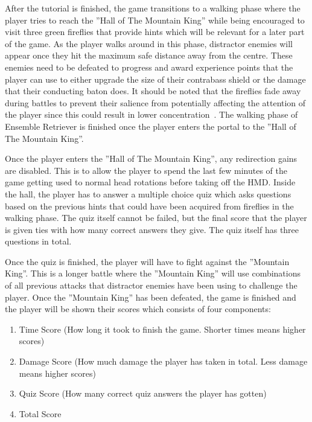 After the tutorial is finished, the game transitions to a walking phase where the player tries to reach the ''Hall of The Mountain King'' while being encouraged to visit three green fireflies that provide hints which will be relevant for a later part of the game. As the player walks around in this phase, distractor enemies will appear once they hit the maximum safe distance away from the centre. These enemies need to be defeated to progress and award experience points that the player can use to either upgrade the size of their contrabass shield or the damage that their conducting baton does. It should be noted that the fireflies fade away during battles to prevent their salience from potentially affecting the attention of the player since this could result in lower concentration~\cite{sitzmann2018saliency}. The walking phase of Ensemble Retriever is finished once the player enters the portal to the ''Hall of The Mountain King''. 

Once the player enters the ''Hall of The Mountain King'', any redirection gains are disabled. This is to allow the player to spend the last few minutes of the game getting used to normal head rotations before taking off the HMD. Inside the hall, the player has to answer a multiple choice quiz which asks questions based on the previous hints that could have been acquired from fireflies in the walking phase. The quiz itself cannot be failed, but the final score that the player is given ties with how many correct answers they give. The quiz itself has three questions in total.

Once the quiz is finished, the player will have to fight against the ''Mountain King''. This is a longer battle where the ''Mountain King'' will use combinations of all previous attacks that distractor enemies have been using to challenge the player. Once the ''Mountain King'' has been defeated, the game is finished and the player will be shown their scores which consists of four components:
\begin{enumerate}
    \item Time Score (How long it took to finish the game. Shorter times means higher scores)
    \item Damage Score (How much damage the player has taken in total. Less damage means higher scores)
    \item Quiz Score (How many correct quiz answers the player has gotten)
    \item Total Score
\end{enumerate}

